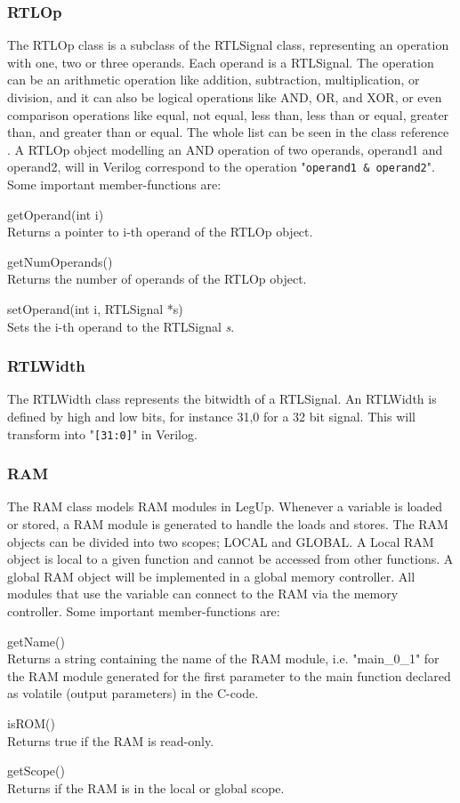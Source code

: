 \subsubsection{RTLOp}
The RTLOp class is a subclass of the RTLSignal class, representing an operation with one, two or three operands. Each operand is a RTLSignal. The operation can be an arithmetic operation like addition, subtraction, multiplication, or division, and it can also be logical operations like AND, OR, and XOR, or even comparison operations like equal, not equal, less than, less than or equal, greater than, and greater than or equal. The whole list can be seen in the class reference \cite{rtlopclassref}. A RTLOp object modelling an AND operation of two operands, operand1 and operand2, will in Verilog correspond to the operation "\verb!operand1 & operand2!". Some important member-functions are:
\begin{compactdesc}
    \item[getOperand(int i)] \hfill \\
    Returns a pointer to i-th operand of the RTLOp object.
    \item[getNumOperands()] \hfill \\
    Returns the number of operands of the RTLOp object.
    \item[setOperand(int i, RTLSignal *s)] \hfill \\
    Sets the i-th operand to the RTLSignal \textit{s}.
\end{compactdesc}
\subsubsection{RTLWidth}
The RTLWidth class represents the bitwidth of a RTLSignal. An RTLWidth is defined by high and low bits, for instance 31,0 for a 32 bit signal. This will transform into "\verb![31:0]!" in Verilog.
\subsubsection{RAM}
The RAM class models RAM modules in LegUp. Whenever a variable is loaded or stored, a RAM module is generated to handle the loads and stores. The RAM objects can be divided into two scopes; LOCAL and GLOBAL. A Local RAM object is local to a given function and cannot be accessed from other functions. A global RAM object will be implemented in a global memory controller. All modules that use the variable can connect to the RAM via the memory controller. Some important member-functions are:
\begin{compactdesc}
    \item[getName()] \hfill \\
    Returns a string containing the name of the RAM module, i.e. "main\_0\_1" for the RAM module generated for the first parameter to the main function declared as volatile (output parameters) in the C-code.
    \item[isROM()] \hfill \\
    Returns true if the RAM is read-only.
    \item[getScope()] \hfill \\
    Returns if the RAM is in the local or global scope.
\end{compactdesc}


